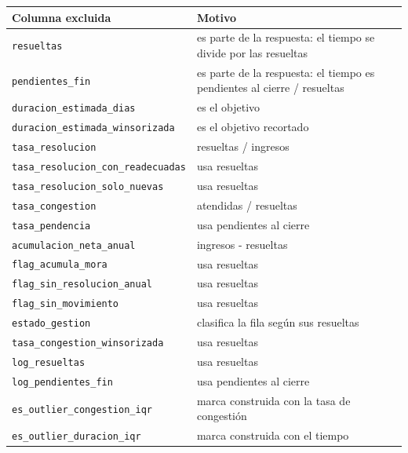 \begin{tabular}{lp{9cm}}
\toprule
Columna excluida & Motivo \\
\midrule
\texttt{resueltas} & es parte de la respuesta: el tiempo se divide por las resueltas \\
\texttt{pendientes\_fin} & es parte de la respuesta: el tiempo es pendientes al cierre / resueltas \\
\texttt{duracion\_estimada\_dias} & es el objetivo \\
\texttt{duracion\_estimada\_winsorizada} & es el objetivo recortado \\
\texttt{tasa\_resolucion} & resueltas / ingresos \\
\texttt{tasa\_resolucion\_con\_readecuadas} & usa resueltas \\
\texttt{tasa\_resolucion\_solo\_nuevas} & usa resueltas \\
\texttt{tasa\_congestion} & atendidas / resueltas \\
\texttt{tasa\_pendencia} & usa pendientes al cierre \\
\texttt{acumulacion\_neta\_anual} & ingresos - resueltas \\
\texttt{flag\_acumula\_mora} & usa resueltas \\
\texttt{flag\_sin\_resolucion\_anual} & usa resueltas \\
\texttt{flag\_sin\_movimiento} & usa resueltas \\
\texttt{estado\_gestion} & clasifica la fila según sus resueltas \\
\texttt{tasa\_congestion\_winsorizada} & usa resueltas \\
\texttt{log\_resueltas} & usa resueltas \\
\texttt{log\_pendientes\_fin} & usa pendientes al cierre \\
\texttt{es\_outlier\_congestion\_iqr} & marca construida con la tasa de congestión \\
\texttt{es\_outlier\_duracion\_iqr} & marca construida con el tiempo \\
\bottomrule
\end{tabular}
